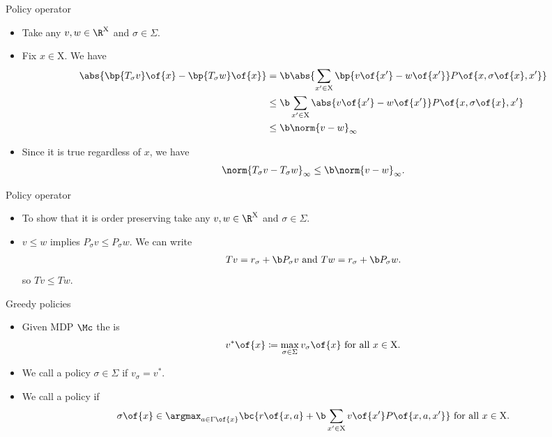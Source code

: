 \documentclass[11pt,xcolor={dvipsnames},aspectratio=159,hyperref={pdftex,pdfpagemode=UseNone,hidelinks,pdfdisplaydoctitle=true},usepdftitle=false]{beamer}
\begin{document}
\begin{frame}{Policy operator}   
    \begin{itemize}
        \item Take any $v,w \in \R^\text{X}$ and $\sigma \in \Sigma$.
        \item Fix $x\in\text{X}$. We have \begin{align*}
            \abs{\bp{T_\sigma v}\of{x} - \bp{T_\sigma w}\of{x}} &= \b \abs{\sum_{x^\prime \in \text{X}} \bp{v\of{x^\prime}-w\of{x^\prime}} P\of{x,\sigma\of{x},x^\prime}} \\
            & \leq \b \sum_{x^\prime \in \text{X}} \abs{v\of{x^\prime}-w\of{x^\prime}} P\of{x,\sigma\of{x},x^\prime} \\
            & \leq \b \norm{v-w}_\infty 
        \end{align*}
        \item Since it is true regardless of $x$, we have \begin{align*}
            \norm{T_\sigma v - T_\sigma w}_\infty \leq \b \norm{v-w}_\infty.
        \end{align*}
    \end{itemize}
    \end{frame}

\begin{frame}{Policy operator}   
    \begin{itemize}
        \item To show that it is order preserving take any $v,w \in \R^\text{X}$ and $\sigma \in \Sigma$.
        \item $v \leq w$ implies $P_\sigma v \leq P_\sigma w$. We can write 
        \begin{align*}
            Tv = r_\sigma + \b P_\sigma v \text{ and } Tw = r_\sigma + \b P_\sigma w.
        \end{align*}
        so $Tv \leq Tw$.
    \end{itemize}
    \end{frame}


        
\begin{frame}{Greedy policies}   
    \begin{itemize}
        \item Given MDP $\Mc$ the  is \begin{align*}
            v^*\of{x} \coloneq \max_{\sigma \in \Sigma} v_\sigma\of{x} \text{ for all } x \in \text{X}.
        \end{align*}
        \item We call a policy $\sigma\in\Sigma$  if $v_\sigma = v^*$. 
        \item We call a policy  if \begin{align*}
            \sigma\of{x} \in \argmax_{a \in \Gamma\of{x}} \bc{r\of{x,a} + \b \sum_{x^\prime \in \text{X}} v\of{x^\prime} P\of{x,a,x^\prime} } \text{ for all } x \in \text{X}.
        \end{align*}
    \end{itemize}
    \end{frame}
 
\end{document}
